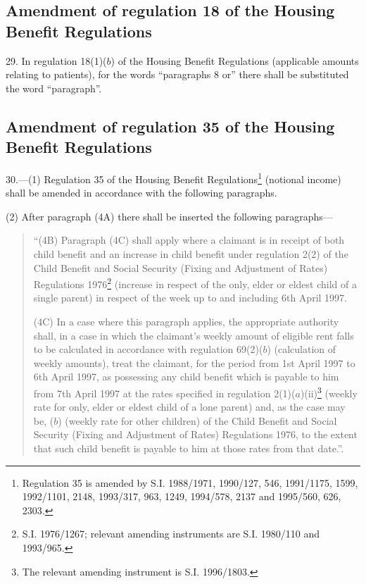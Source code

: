 \documentclass[12pt,a4paper]{article}
\begin{document}
\subsection[29. Amendment of regulation 18 of the Housing Benefit Regulations]{Amendment of regulation 18 of the Housing Benefit Regulations}

29.  In regulation 18(1)($b$) of the Housing Benefit Regulations (applicable amounts relating to patients), for the words “paragraphs 8 or” there shall be substituted the word “paragraph”.

\subsection[30. Amendment of regulation 35 of the Housing Benefit Regulations]{Amendment of regulation 35 of the Housing Benefit Regulations}

30.—(1) Regulation 35 of the Housing Benefit Regulations\footnote{\frenchspacing Regulation 35 is amended by S.I. 1988/1971, 1990/127, 546, 1991/1175, 1599, 1992/1101, 2148, 1993/317, 963, 1249, 1994/578, 2137 and 1995/560, 626, 2303.} (notional income) shall be amended in accordance with the following paragraphs.

(2) After paragraph (4A) there shall be inserted the following paragraphs—
\begin{quotation}
“(4B) Paragraph (4C) shall apply where a claimant is in receipt of both child benefit and an increase in child benefit under regulation 2(2) of the Child Benefit and Social Security (Fixing and Adjustment of Rates) Regulations 1976\footnote{\frenchspacing S.I. 1976/1267; relevant amending instruments are S.I. 1980/110 and 1993/965.} (increase in respect of the only, elder or eldest child of a single parent) in respect of the week up to and including 6th April 1997.

(4C) In a case where this paragraph applies, the appropriate authority shall, in a case in which the claimant’s weekly amount of eligible rent falls to be calculated in accordance with regulation 69(2)($b$) (calculation of weekly amounts), treat the claimant, for the period from 1st April 1997 to 6th April 1997, as possessing any child benefit which is payable to him from 7th April 1997 at the rates specified in regulation 2(1)($a$)(ii)\footnote{\frenchspacing The relevant amending instrument is S.I. 1996/1803.} (weekly rate for only, elder or eldest child of a lone parent) and, as the case may be, ($b$) (weekly rate for other children) of the Child Benefit and Social Security (Fixing and Adjustment of Rates) Regulations 1976, to the extent that such child benefit is payable to him at those rates from that date.”.
\end{quotation}
\end{document}
